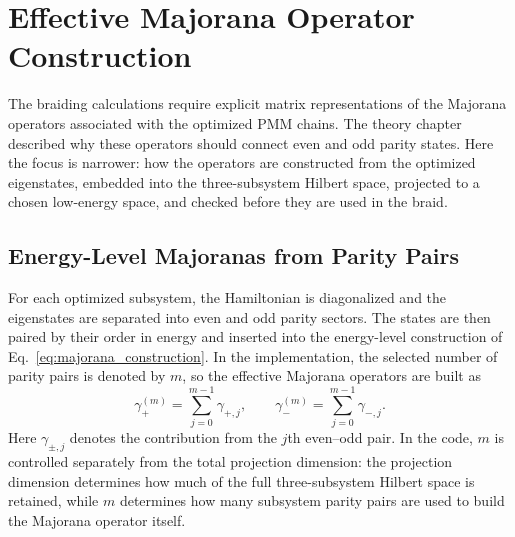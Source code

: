 \section{Effective Majorana Operator Construction}
\label{sec:method-effective-majorana-construction}
The braiding calculations require explicit matrix representations of the Majorana operators associated with the optimized PMM chains. The theory chapter described why these operators should connect even and odd parity states. Here the focus is narrower: how the operators are constructed from the optimized eigenstates, embedded into the three-subsystem Hilbert space, projected to a chosen low-energy space, and checked before they are used in the braid.

\subsection{Energy-Level Majoranas from Parity Pairs}
For each optimized subsystem, the Hamiltonian is diagonalized and the eigenstates are separated into even and odd parity sectors. The states are then paired by their order in energy and inserted into the energy-level construction of Eq.~\ref{eq:majorana_construction}. In the implementation, the selected number of parity pairs is denoted by $m$, so the effective Majorana operators are built as
\begin{equation}
\gamma_{+}^{(m)}
=
\sum_{j=0}^{m-1}\gamma_{+,j},
\qquad
\gamma_{-}^{(m)}
=
\sum_{j=0}^{m-1}\gamma_{-,j}.
\label{eq:method_energy_level_majoranas}
\end{equation}
Here $\gamma_{\pm,j}$ denotes the contribution from the $j$th even--odd pair. In the code, $m$ is controlled separately from the total projection dimension: the projection dimension determines how much of the full three-subsystem Hilbert space is retained, while $m$ determines how many subsystem parity pairs are used to build the Majorana operator itself.

